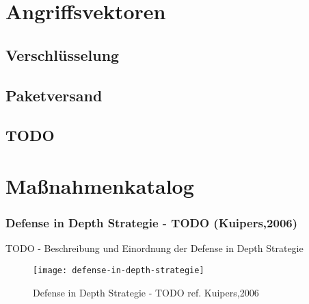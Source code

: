 \section{Angriffsvektoren}
\subsection{Verschlüsselung}
\subsection{Paketversand}
\subsection{TODO}

\section{Maßnahmenkatalog}
\subsubsection{Defense in Depth Strategie - TODO (Kuipers,2006)}
TODO - Beschreibung und Einordnung der Defense in Depth Strategie

\begin{figure}[h]
    \centering
    \texttt{[image: defense-in-depth-strategie]}
    \caption{Defense in Depth Strategie - TODO ref. Kuipers,2006}
    \label{Kap3:Defense-in-Depth}
\end{figure}